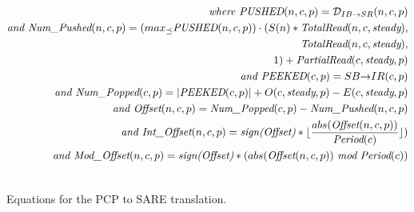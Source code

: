 \begin{figure}[t]
{\begin{minipage}{6.3in}
\begin{itemize}
\begin{align}
%
%
\mt{where }\mt{PUSHED}(n,c,p) = {\cal D}_{IB {\small \rightarrow} SR}(n,c,p) \\ \nonumber
\mt{and }\mt{Num\_Pushed}(n,c,p) = 
  (max_{\preceq}\mt{PUSHED}(n,c,p)) \cdot (S(n) * \mt{TotalRead}(n,c,\mt{steady}), \\ \nonumber
                                        \mt{TotalRead}(n,c,\mt{steady}), \\ \nonumber
                                        1 ) + \mt{PartialRead}(c, \mt{steady}, p) \\ \nonumber
\mt{and }\mt{PEEKED}(c,p) = {SB {\small \rightarrow} IR}(c,p) \\ \nonumber
\mt{and }\mt{Num\_Popped}(c,p) = |\mt{PEEKED}(c,p)| + O(c,\mt{steady},p) - E(c,\mt{steady},p) \\ \nonumber
\mt{and }\mt{Offset}(n,c,p) = \mt{Num\_Popped}(c,p)-\mt{Num\_Pushed}(n,c,p) \\ \nonumber
\mt{and }\mt{Int\_Offset}(n,c,p) = \mt{sign(Offset)}*\lfloor \frac{abs(\mt{Offset}(n,c,p))}{\mt{Period}(c)} \rfloor) \\ \nonumber
\mt{and }\mt{Mod\_Offset}(n,c,p) = \mt{sign(Offset)}*(abs(\mt{Offset}(n,c,p))~\mt{mod}~\mt{Period}(c)) \\ \nonumber
%
\end{align}
%
\end{itemize}
\end{minipage}}
\caption{Equations for the PCP to SARE translation.
\protect\label{fig:pcptosare3}}
\end{figure}

